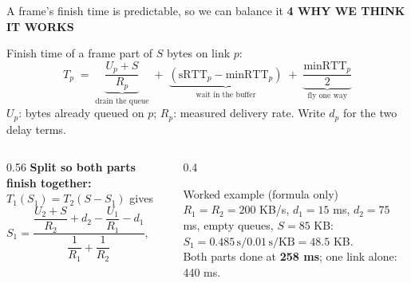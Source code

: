 \documentclass[aspectratio=169,11pt]{beamer}
\newcommand{\eyebrow}[1]{{\color{accent}\footnotesize\bfseries\MakeUppercase{#1}}\par\smallskip}
\begin{document}
\begin{frame}{A frame's finish time is predictable, so we can balance it}
  \eyebrow{4 \textperiodcentered{} Why we think it works}
  Finish time of a frame part of $S$ bytes on link $p$:
  \[
    T_p \;=\; \underbrace{\frac{U_p + S}{R_p}}_{\text{drain the queue}}
    \;+\; \underbrace{(\mathrm{sRTT}_p - \mathrm{minRTT}_p)}_{\text{wait in the buffer}}
    \;+\; \underbrace{\frac{\mathrm{minRTT}_p}{2}}_{\text{fly one way}}
  \]
  {\small $U_p$: bytes already queued on $p$; $R_p$: measured delivery rate. Write $d_p$ for the two delay terms.}

  \begin{columns}[T]
    \begin{column}{0.56\textwidth}
      \textbf{Split so both parts finish together:} $T_1(S_1) = T_2(S - S_1)$ gives
      \[
        S_1 = \frac{\dfrac{U_2 + S}{R_2} + d_2 - \dfrac{U_1}{R_1} - d_1}{\dfrac{1}{R_1} + \dfrac{1}{R_2}},
        \qquad 0 \le S_1 \le S .
      \]
    \end{column}
    \begin{column}{0.4\textwidth}
      \begin{block}{Worked example (formula only)}
        \small $R_1 = R_2 = 200$ KB/s, $d_1 = 15$ ms, $d_2 = 75$ ms, empty queues, $S = 85$ KB:\\
        $S_1 = 0.485\,\text{s} / 0.01\,\text{s/KB} = 48.5$ KB.\\
        Both parts done at \textbf{258 ms}; one link alone: 440 ms.
      \end{block}
    \end{column}
  \end{columns}
\end{frame}
\end{document}
